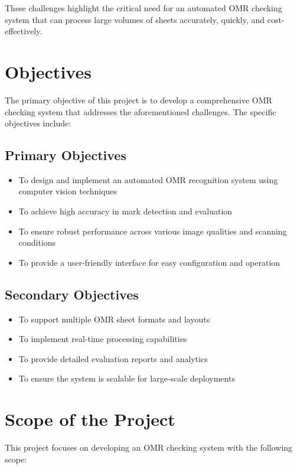 These challenges highlight the critical need for an automated OMR checking system that can process large volumes of sheets accurately, quickly, and cost-effectively.

\section{Objectives}

The primary objective of this project is to develop a comprehensive OMR checking system that addresses the aforementioned challenges. The specific objectives include:

\subsection{Primary Objectives}
\begin{itemize}
\item To design and implement an automated OMR recognition system using computer vision techniques
\item To achieve high accuracy in mark detection and evaluation
\item To ensure robust performance across various image qualities and scanning conditions
\item To provide a user-friendly interface for easy configuration and operation
\end{itemize}

\subsection{Secondary Objectives}
\begin{itemize}
\item To support multiple OMR sheet formats and layouts
\item To implement real-time processing capabilities
\item To provide detailed evaluation reports and analytics
\item To ensure the system is scalable for large-scale deployments
\end{itemize}

\section{Scope of the Project}

This project focuses on developing an OMR checking system with the following scope:

